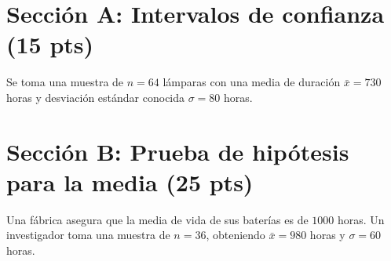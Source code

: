 \documentclass[11pt,a4paper]{exam}
\begin{document}
\begin{questions}
\section*{Sección A: Intervalos de confianza (15 pts)}

\question Se toma una muestra de $n=64$ lámparas con una media de duración $\bar{x}=730$ horas y desviación estándar conocida $\sigma=80$ horas.

\section*{Sección B: Prueba de hipótesis para la media (25 pts)}


\question Una fábrica asegura que la media de vida de sus baterías es de $1000$ horas. Un investigador toma una muestra de $n=36$, obteniendo $\bar{x}=980$ horas y $\sigma=60$ horas.


\end{questions}
\end{document}
